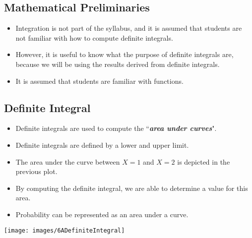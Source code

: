 \documentclass[a4paper,12pt]{article}
\begin{document}



\subsection*{Mathematical Preliminaries}
\begin{itemize}
\item Integration is not part of the syllabus, and it is assumed that students are not familiar with how to compute definite integrals.
\item However,  it is useful to know what the purpose of definite integrals are, because we will be using the results derived from definite integrals. \item It is assumed that students are familiar with functions.
\end{itemize}



\subsection*{Definite Integral}
\begin{itemize}
\item Definite integrals are used to compute the ``\textbf{\textit{area under curves}}".
\item Definite integrals are defined by a lower and upper limit.
\item The area under the curve between $X=1$ and $X=2$ is depicted in the previous plot.
\item By computing the definite integral, we are able to determine a value for this area.
\item Probability can be represented as an area under a curve.
\end{itemize}

\begin{center}
\texttt{[image: images/6ADefiniteIntegral]}
\end{center}
\end{document}
